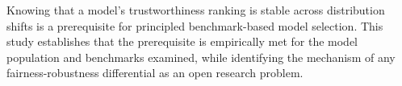 Knowing that a model's trustworthiness ranking is stable across distribution shifts is a prerequisite for principled benchmark-based model selection. This study establishes that the prerequisite is empirically met for the model population and benchmarks examined, while identifying the mechanism of any fairness-robustness differential as an open research problem.

